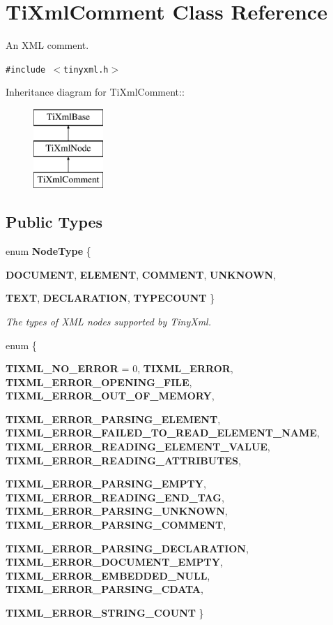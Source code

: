 \section{Ti\-Xml\-Comment Class Reference}
\label{classTiXmlComment}
An XML comment.  


{\tt \#include $<$tinyxml.h$>$}

Inheritance diagram for Ti\-Xml\-Comment::\begin{figure}[H]
\begin{center}
\leavevmode
\includegraphics[height=3cm]{classTiXmlComment}
\end{center}
\end{figure}
\subsection*{Public Types}
\begin{CompactItemize}
\item 
enum {\bf Node\-Type} \{ \par
{\bf DOCUMENT}, 
{\bf ELEMENT}, 
{\bf COMMENT}, 
{\bf UNKNOWN}, 
\par
{\bf TEXT}, 
{\bf DECLARATION}, 
{\bf TYPECOUNT}
 \}
\begin{CompactList}\small\item\em The types of XML nodes supported by Tiny\-Xml. \item\end{CompactList}\item 
enum \{ \par
{\bf TIXML\_\-NO\_\-ERROR} =  0, 
{\bf TIXML\_\-ERROR}, 
{\bf TIXML\_\-ERROR\_\-OPENING\_\-FILE}, 
{\bf TIXML\_\-ERROR\_\-OUT\_\-OF\_\-MEMORY}, 
\par
{\bf TIXML\_\-ERROR\_\-PARSING\_\-ELEMENT}, 
{\bf TIXML\_\-ERROR\_\-FAILED\_\-TO\_\-READ\_\-ELEMENT\_\-NAME}, 
{\bf TIXML\_\-ERROR\_\-READING\_\-ELEMENT\_\-VALUE}, 
{\bf TIXML\_\-ERROR\_\-READING\_\-ATTRIBUTES}, 
\par
{\bf TIXML\_\-ERROR\_\-PARSING\_\-EMPTY}, 
{\bf TIXML\_\-ERROR\_\-READING\_\-END\_\-TAG}, 
{\bf TIXML\_\-ERROR\_\-PARSING\_\-UNKNOWN}, 
{\bf TIXML\_\-ERROR\_\-PARSING\_\-COMMENT}, 
\par
{\bf TIXML\_\-ERROR\_\-PARSING\_\-DECLARATION}, 
{\bf TIXML\_\-ERROR\_\-DOCUMENT\_\-EMPTY}, 
{\bf TIXML\_\-ERROR\_\-EMBEDDED\_\-NULL}, 
{\bf TIXML\_\-ERROR\_\-PARSING\_\-CDATA}, 
\par
{\bf TIXML\_\-ERROR\_\-STRING\_\-COUNT}
 \}
\end{CompactItemize}
